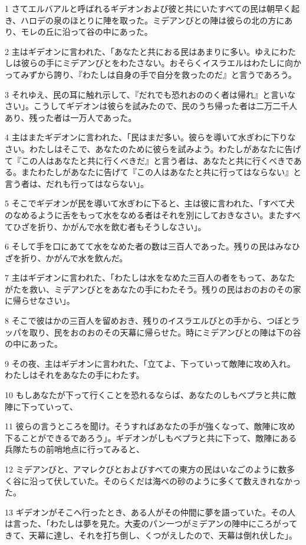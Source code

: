 \par 1 さてエルバアルと呼ばれるギデオンおよび彼と共にいたすべての民は朝早く起き、ハロデの泉のほとりに陣を取った。ミデアンびとの陣は彼らの北の方にあり、モレの丘に沿って谷の中にあった。
\par 2 主はギデオンに言われた、「あなたと共におる民はあまりに多い。ゆえにわたしは彼らの手にミデアンびとをわたさない。おそらくイスラエルはわたしに向かってみずから誇り、『わたしは自身の手で自分を救ったのだ』と言うであろう。
\par 3 それゆえ、民の耳に触れ示して、『だれでも恐れおののく者は帰れ』と言いなさい」。こうしてギデオンは彼らを試みたので、民のうち帰った者は二万二千人あり、残った者は一万人であった。
\par 4 主はまたギデオンに言われた、「民はまだ多い。彼らを導いて水ぎわに下りなさい。わたしはそこで、あなたのために彼らを試みよう。わたしがあなたに告げて『この人はあなたと共に行くべきだ』と言う者は、あなたと共に行くべきである。またわたしがあなたに告げて『この人はあなたと共に行ってはならない』と言う者は、だれも行ってはならない」。
\par 5 そこでギデオンが民を導いて水ぎわに下ると、主は彼に言われた、「すべて犬のなめるように舌をもって水をなめる者はそれを別にしておきなさい。またすべてひざを折り、かがんで水を飲む者もそうしなさい」。
\par 6 そして手を口にあてて水をなめた者の数は三百人であった。残りの民はみなひざを折り、かがんで水を飲んだ。
\par 7 主はギデオンに言われた、「わたしは水をなめた三百人の者をもって、あなたがたを救い、ミデアンびとをあなたの手にわたそう。残りの民はおのおのその家に帰らせなさい」。
\par 8 そこで彼はかの三百人を留めおき、残りのイスラエルびとの手から、つぼとラッパを取り、民をおのおのその天幕に帰らせた。時にミデアンびとの陣は下の谷の中にあった。
\par 9 その夜、主はギデオンに言われた、「立てよ、下っていって敵陣に攻め入れ。わたしはそれをあなたの手にわたす。
\par 10 もしあなたが下って行くことを恐れるならば、あなたのしもべプラと共に敵陣に下っていって、
\par 11 彼らの言うところを聞け。そうすればあなたの手が強くなって、敵陣に攻め下ることができるであろう」。ギデオンがしもべプラと共に下って、敵陣にある兵隊たちの前哨地点に行ってみると、
\par 12 ミデアンびと、アマレクびとおよびすべての東方の民はいなごのように数多く谷に沿って伏していた。そのらくだは海べの砂のように多くて数えきれなかった。
\par 13 ギデオンがそこへ行ったとき、ある人がその仲間に夢を語っていた。その人は言った、「わたしは夢を見た。大麦のパン一つがミデアンの陣中にころがってきて、天幕に達し、それを打ち倒し、くつがえしたので、天幕は倒れ伏した」。
